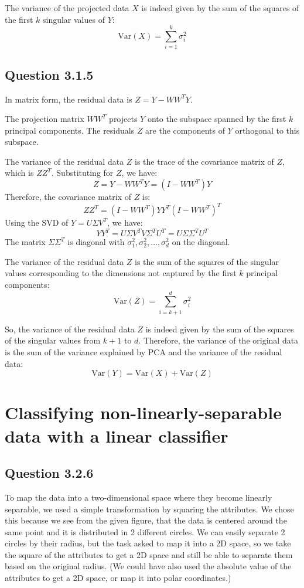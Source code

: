 \documentclass{article}
\begin{document}
The variance of the projected data \( X \) is indeed given by the sum of the squares of the first \( k \) singular values of \( Y \):
\[
\text{Var}(X) = \sum_{i=1}^{k} \sigma_i^2
\]

\subsection{Question 3.1.5}

In matrix form, the residual data is \( Z = Y - W W^T Y \).

The projection matrix \( W W^T \) projects \( Y \) onto the subspace spanned by the first \( k \) principal components. The residuals \( Z \) are the components of \( Y \) orthogonal to this subspace.

The variance of the residual data \( Z \) is the trace of the covariance matrix of \( Z \), which is \( Z Z^T \). Substituting for \( Z \), we have:
\[
Z = Y - W W^T Y = (I - W W^T) Y
\]
Therefore, the covariance matrix of \( Z \) is:
\[
Z Z^T = (I - W W^T) Y Y^T (I - W W^T)^T
\]
Using the SVD of \( Y = U \Sigma V^T \), we have:
\[
Y Y^T = U \Sigma V^T V \Sigma^T U^T = U \Sigma \Sigma^T U^T
\]
The matrix \( \Sigma \Sigma^T \) is diagonal with \(\sigma_1^2, \sigma_2^2, \ldots, \sigma_d^2\) on the diagonal.

The variance of the residual data \( Z \) is the sum of the squares of the singular values corresponding to the dimensions not captured by the first \( k \) principal components:
\[
\text{Var}(Z) = \sum_{i=k+1}^{d} \sigma_i^2
\]

So, the variance of the residual data \( Z \) is indeed given by the sum of the squares of the singular values from \( k+1 \) to \( d \). Therefore, the variance of the original data is the sum of the variance explained by PCA and the variance of the residual data:
\[
\text{Var}(Y) = \text{Var}(X) + \text{Var}(Z)
\]

\section{Classifying non-linearly-separable data with a linear classifier}

\subsection{Question 3.2.6}

To map the data into a two-dimensional space where they become linearly separable, we used a simple transformation by squaring the attributes. We chose this because we see from the given figure, that the data is centered around the same point and it is distributed in 2 different circles. We can easily separate 2 circles by their radius, but the task asked to map it into a 2D space, so we take the square of the attributes to get a 2D space and still be able to separate them based on the original radius. (We could have also used the absolute value of the attributes to get a 2D space, or map it into polar coordinates.)
\end{document}
